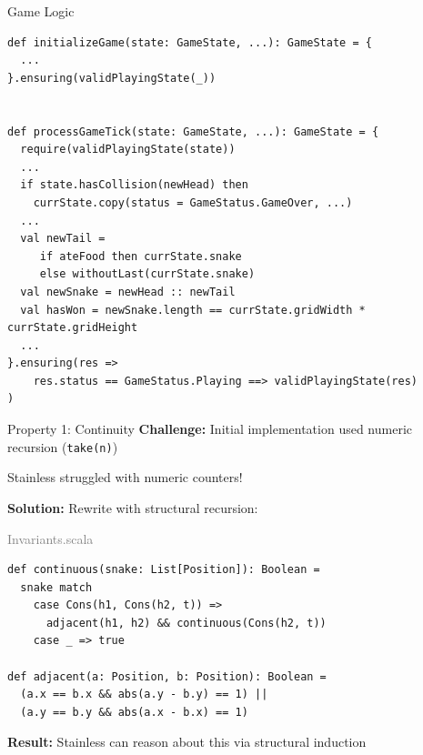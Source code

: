 \documentclass{beamer}
\begin{document}
\begin{frame}[fragile]{Game Logic}
\begin{lstlisting}[style=scala]
def initializeGame(state: GameState, ...): GameState = {
  ...
}.ensuring(validPlayingState(_))


def processGameTick(state: GameState, ...): GameState = {
  require(validPlayingState(state))
  ...
  if state.hasCollision(newHead) then
    currState.copy(status = GameStatus.GameOver, ...)
  ...
  val newTail =
     if ateFood then currState.snake
     else withoutLast(currState.snake)
  val newSnake = newHead :: newTail
  val hasWon = newSnake.length == currState.gridWidth * currState.gridHeight
  ...
}.ensuring(res =>
    res.status == GameStatus.Playing ==> validPlayingState(res)
)

\end{lstlisting}
\end{frame}
\begin{frame}[fragile]{Property 1: Continuity}
\textbf{Challenge:} Initial implementation used numeric recursion (\texttt{take(n)})

Stainless struggled with numeric counters!

\vspace{0.3cm}
\textbf{Solution:} Rewrite with structural recursion:

\begin{flushright}
\tiny\textcolor{gray}{Invariants.scala}
\end{flushright}
\vspace{-0.5cm}
\begin{lstlisting}[style=scala]
def continuous(snake: List[Position]): Boolean =
  snake match
    case Cons(h1, Cons(h2, t)) => 
      adjacent(h1, h2) && continuous(Cons(h2, t))
    case _ => true

def adjacent(a: Position, b: Position): Boolean =
  (a.x == b.x && abs(a.y - b.y) == 1) ||
  (a.y == b.y && abs(a.x - b.x) == 1)
\end{lstlisting}

\textbf{Result:} Stainless can reason about this via structural induction
\end{frame}
\end{document}
